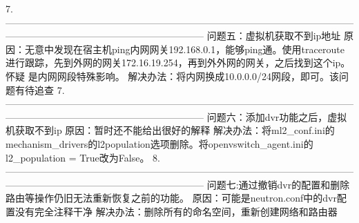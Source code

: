 \documentclass[a4paper,left=1.5cm,right=1.5cm,11pt]{article}
\begin{document}
7.--------------------------------------------------------------------------------------------------------------------------------------------------------------------------
	问题五：虚拟机获取不到ip地址
	原因：无意中发现在宿主机ping内网网关192.168.0.1，能够ping通。使用traceroute进行跟踪，先到外网的网关172.16.19.254，再到外外网的网关，之后找到这个ip。怀疑
	是内网网段特殊影响。
	解决办法：将内网换成10.0.0.0/24网段，即可。该问题有待追查
7.--------------------------------------------------------------------------------------------------------------------------------------------------------------------------
	问题六：添加dvr功能之后，虚拟机获取不到ip
	原因：暂时还不能给出很好的解释
	解决办法：将ml2_conf.ini的mechanism_drivers的l2population选项删除。将openvswitch_agent.ini的l2_population = True改为False。
8.--------------------------------------------------------------------------------------------------------------------------------------------------------------------------
	问题七:通过撤销dvr的配置和删除路由等操作仍旧无法重新恢复之前的功能。
	原因：可能是neutron.conf中的dvr配置没有完全注释干净
	解决办法：删除所有的命名空间，重新创建网络和路由器
	
\end{document}
